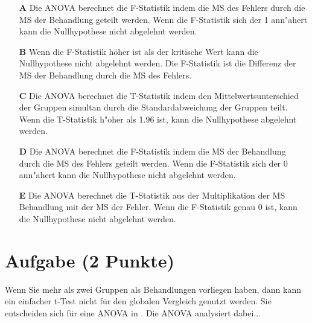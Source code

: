 \documentclass[a4paper, 9pt]{scrartcl}\usepackage[]{graphicx}\usepackage[]{xcolor}
\begin{document}
\begin{enumerate}
\item [\textbf{A} \msquare] Die ANOVA berechnet die F-Statistik indem die MS des Fehlers durch die MS der Behandlung geteilt werden. Wenn die F-Statistik sich der 1 ann{"a}hert kann die Nullhypothese nicht abgelehnt werden.
\item [\textbf{B} \msquare] Wenn die F-Statistik höher ist als der kritische Wert kann die Nullhypothese nicht abgelehnt werden. Die F-Statistik ist die Differenz der MS der Behandlung durch die MS des Fehlers.
\item [\textbf{C} \msquare] Die ANOVA berechnet die T-Statistik indem den Mittelwertsunterschied der Gruppen simultan durch die Standardabweichung der Gruppen teilt. Wenn die T-Statistik h{"o}her als 1.96 ist, kann die Nullhypothese abgelehnt werden.
\item [\textbf{D} \msquare] Die ANOVA berechnet die F-Statistik indem die MS der Behandlung durch die MS des Fehlers geteilt werden. Wenn die F-Statistik sich der 0 ann{"a}hert kann die Nullhypothese nicht abgelehnt werden.
\item [\textbf{E} \msquare] Die ANOVA berechnet die T-Statistik aus der Multiplikation der MS Behandlung mit der MS der Fehler. Wenn die F-Statistik genau 0 ist, kann die Nullhypothese nicht abgelehnt werden.
\end{enumerate} 

\section{Aufgabe \hfill (2 Punkte)}




Wenn Sie mehr als zwei Gruppen als Behandlungen vorliegen haben, dann kann ein einfacher t-Test nicht für den globalen Vergleich genutzt werden. Sie entscheiden sich für eine ANOVA in \Rlogo. Die ANOVA analysiert dabei...
\end{document}

